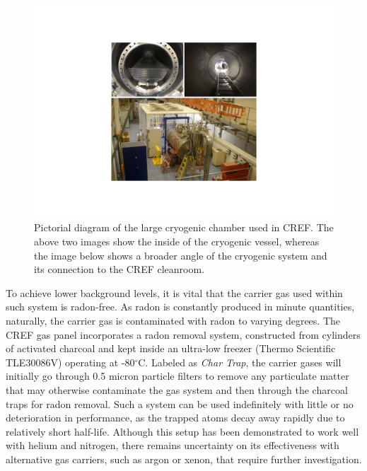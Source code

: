 \begin{figure}[h!]
    \centering
    \includegraphics[scale=0.78]{Chapter_7/Figures/cryo_cooler_chamber_and_lab.pdf}
    \caption[Pictorial diagram of the large cryogenic chamber used in CREF.]%
    {Pictorial diagram of the large cryogenic chamber used in CREF. The above two images show the inside of the cryogenic vessel, whereas the image below shows a broader angle of the cryogenic system and its connection to the CREF cleanroom.}
    \label{fig:cref_cryogenic_chamber}
\end{figure}
%

To achieve lower background levels, it is vital that the carrier gas used within such system is radon-free. As radon is constantly produced in minute quantities, naturally, the carrier gas is contaminated with radon to varying degrees. The CREF gas panel incorporates a radon removal system, constructed from cylinders of activated charcoal and kept inside an ultra-low freezer (Thermo Scientific TLE30086V) operating at -80$^{\circ}$C. Labeled as \textit{Char Trap}, the carrier gases will initially go through 0.5 micron particle filters to remove any particulate matter that may otherwise contaminate the gas system and then through the charcoal traps for radon removal. Such a system can be used indefinitely with little or no deterioration in performance, as the trapped \RnTTT{} atoms decay away rapidly due to relatively short half-life. Although this setup has been demonstrated to work well with helium and nitrogen, there remains uncertainty on its effectiveness with alternative gas carriers, such as argon or xenon, that require further investigation. 


